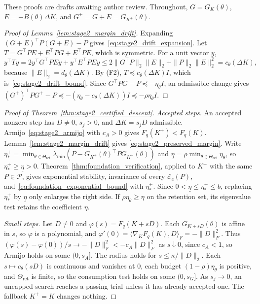 These proofs are drafts awaiting author review. Throughout, $G=G_K(\theta)$,
$E=-B(\theta)\Delta K$, and $G^+=G+E=G_{K^+}(\theta)$.

\begin{proof}[Proof of Lemma~\ref{lem:stage2_margin_drift}]
Expanding $(G+E)^\top P(G+E)-P$ gives~\eqref{eq:stage2_drift_expansion}. Let
$T=G^\top PE+E^\top PG+E^\top PE$, which is symmetric. For a unit vector $y$,
\[
 y^\top Ty=2y^\top G^\top PEy+y^\top E^\top PEy
 \le2\|G^\top P\|_2\|E\|_2+\|P\|_2\|E\|_2^2=c_\theta(\Delta K),
\]
because $\|E\|_2=d_\theta(\Delta K)$. By (F2), $T\preceq c_\theta(\Delta K)I$,
which is~\eqref{eq:stage2_drift_bound}. Since
$G^\top PG-P\preceq-\eta_\theta I$, an admissible change gives
$(G^+)^\top PG^+-P\preceq-(\eta_\theta-c_\theta(\Delta K))I
\preceq-\rho\eta_\theta I$.
\end{proof}

\begin{proof}[Proof of Theorem~\ref{thm:stage2_certified_descent}]
\emph{Accepted steps.} An accepted nonzero step has $D\ne0$, $s_j>0$, and
$\Delta K=s_jD$ admissible. Armijo~\eqref{eq:stage2_armijo} with $c_A>0$ gives
$F_q(K^+)<F_q(K)$. Lemma~\ref{lem:stage2_margin_drift} gives
\eqref{eq:stage2_preserved_margin}. Write
$\eta_*^+=\min_{\theta\in\Theta_{\mathrm{ret}}}
\lambda_{\min}(P-G_{K^+}(\theta)^\top PG_{K^+}(\theta))$ and
$\underline\eta=\rho\min_{\theta\in\Theta_{\mathrm{ret}}}\eta_\theta$, so
$\eta_*^+\ge\underline\eta>0$. Theorem~\ref{thm:foundation_verification}, applied to
$K^+$ with the same $P\in\mathcal P$, gives exponential stability, invariance of
every $\mathcal E_c(P)$, and~\eqref{eq:foundation_exponential_bound} with
$\eta_*^+$. Since $0<\underline\eta\le\eta_*^+\le b$, replacing $\eta_*^+$ by
$\underline\eta$ only enlarges the right side. If $\rho\eta_\theta\ge\eta$ on the
retention set, its eigenvalue test retains the coefficient $\eta$.

\emph{Small steps.} Let $D\ne0$ and $\varphi(s)=F_q(K+sD)$. Each $G_{K+sD}(\theta)$
is affine in $s$, so $\varphi$ is a polynomial, and
$\varphi'(0)=\langle\nabla_KF_q(K),D\rangle_F=-\|D\|_F^2$. Thus
$(\varphi(s)-\varphi(0))/s\to-\|D\|_F^2<-c_A\|D\|_F^2$ as $s\downarrow0$, since
$c_A<1$, so Armijo holds on some $(0,s_A]$. The radius holds for
$s\le\kappa/\|D\|_2$. Each $s\mapsto c_\theta(sD)$ is continuous and vanishes at
$0$, each budget $(1-\rho)\eta_\theta$ is positive, and $\Theta_{\mathrm{ret}}$ is
finite, so the consumption test holds on some $(0,s_G]$. As $s_j\to0$, an uncapped
search reaches a passing trial unless it has already accepted one. The fallback
$K^+=K$ changes nothing.
\end{proof}

